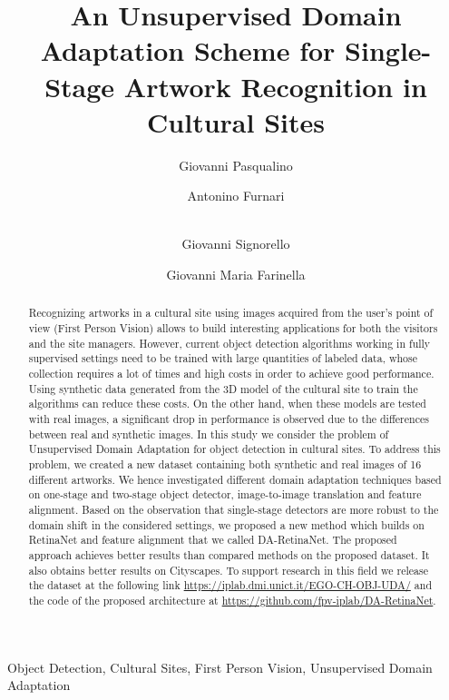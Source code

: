 \documentclass[preprint]{elsarticle}
\begin{document}
\begin{frontmatter}

\title{An Unsupervised Domain Adaptation Scheme for Single-Stage Artwork Recognition in Cultural Sites}

\author[1]{Giovanni Pasqualino} 
\author[1]{Antonino Furnari}
\author[2]{\\Giovanni Signorello}
\author[1,2,3]{Giovanni Maria Farinella}

\address[1]{Department of Mathematics and Computer Science, University of Catania, Italy}
\address[2]{CUTGANA, University of Catania, Italy}
\address[3]{ICAR-CNR, National Research Council, Palermo,Italy}

\begin{abstract}
Recognizing artworks in a cultural site using images acquired from the user's point of view (First Person Vision) allows to build interesting applications for both the visitors and the site managers. However, current object detection algorithms working in fully supervised settings need to be trained with large quantities of labeled data, whose collection requires a lot of times and high costs in order to achieve good performance. Using synthetic data generated from the 3D model of the cultural site to train the algorithms can reduce these costs. On the other hand, when these models are tested with real images, a significant drop in performance is observed due to the differences between real and synthetic images. In this study we consider the problem of Unsupervised Domain Adaptation for object detection in cultural sites. To address this problem, we created a new dataset containing both synthetic and real images of 16 different artworks. We hence investigated different domain adaptation techniques based on one-stage and two-stage object detector, image-to-image translation and feature alignment. Based on the observation that single-stage detectors are more robust to the domain shift in the considered settings, we proposed a new method which builds on RetinaNet and feature alignment that we called DA-RetinaNet. The proposed approach achieves better results than compared methods on the proposed dataset. It also obtains better results on Cityscapes.
To support research in this field we release the dataset at the following link \url{https://iplab.dmi.unict.it/EGO-CH-OBJ-UDA/} and the code of the proposed architecture at \url{https://github.com/fpv-iplab/DA-RetinaNet}.
\end{abstract}

\begin{keyword}
Object Detection, Cultural Sites, First Person Vision, Unsupervised Domain Adaptation
\end{keyword}
\end{frontmatter}
\end{document}
